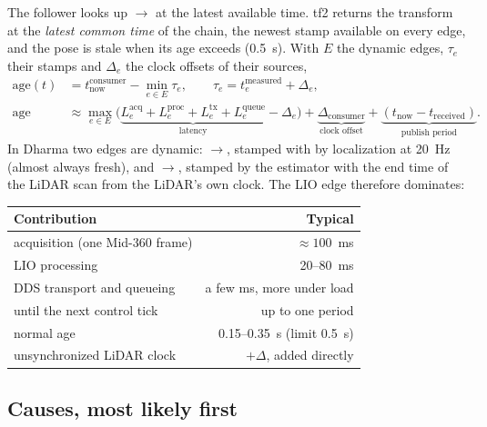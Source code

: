 The follower looks up $\to$ at the latest available time. tf2 returns the
transform at the \emph{latest common time} of the chain, the newest stamp available on every
edge, and the pose is stale when its age exceeds  (0.5~s). With $E$
the dynamic edges, $\tau_e$ their stamps and $\Delta_e$ the clock offsets of their sources,
\begin{align}
  \mathrm{age}(t) &= t_{\mathrm{now}}^{\mathrm{consumer}} - \min_{e\in E}\tau_e,
    \qquad \tau_e = t_e^{\mathrm{measured}} + \Delta_e, \\
  \mathrm{age} &\approx \max_{e\in E}\Big(\underbrace{L_e^{\mathrm{acq}} + L_e^{\mathrm{proc}} +
    L_e^{\mathrm{tx}} + L_e^{\mathrm{queue}}}_{\text{latency}} - \Delta_e\Big) +
    \underbrace{\Delta_{\mathrm{consumer}}}_{\text{clock offset}} +
    \underbrace{(t_{\mathrm{now}} - t_{\mathrm{received}})}_{\text{publish period}}.
\end{align}
In Dharma two edges are dynamic: $\to$, stamped with  by
localization at 20~Hz (almost always fresh), and $\to$, stamped by the
estimator with the end time of the LiDAR scan from the LiDAR's own clock. The LIO edge therefore
dominates:
\begin{center}
\begin{tabular}{@{}lr@{}}
  \toprule
  Contribution & Typical \\
  \midrule
  acquisition (one Mid-360 frame) & $\approx 100$~ms \\
  LIO processing & 20--80~ms \\
  DDS transport and queueing & a few ms, more under load \\
  until the next control tick & up to one period \\
  \midrule
  normal age & 0.15--0.35~s (limit 0.5~s) \\
  unsynchronized LiDAR clock & $+\Delta$, added directly \\
  \bottomrule
\end{tabular}
\end{center}

\subsection{Causes, most likely first}

